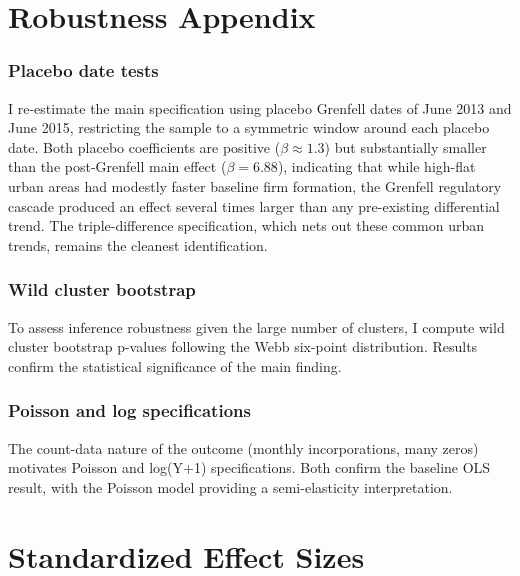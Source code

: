 \documentclass[12pt]{article}
\begin{document}
\section{Robustness Appendix}

\subsubsection*{Placebo date tests} I re-estimate the main specification using placebo Grenfell dates of June 2013 and June 2015, restricting the sample to a symmetric window around each placebo date. Both placebo coefficients are positive ($\beta \approx 1.3$) but substantially smaller than the post-Grenfell main effect ($\beta = 6.88$), indicating that while high-flat urban areas had modestly faster baseline firm formation, the Grenfell regulatory cascade produced an effect several times larger than any pre-existing differential trend. The triple-difference specification, which nets out these common urban trends, remains the cleanest identification.

\subsubsection*{Wild cluster bootstrap} To assess inference robustness given the large number of clusters, I compute wild cluster bootstrap p-values following the Webb six-point distribution. Results confirm the statistical significance of the main finding.

\subsubsection*{Poisson and log specifications} The count-data nature of the outcome (monthly incorporations, many zeros) motivates Poisson and log(Y+1) specifications. Both confirm the baseline OLS result, with the Poisson model providing a semi-elasticity interpretation.


\section{Standardized Effect Sizes}
\label{sec:sde}


\end{document}
